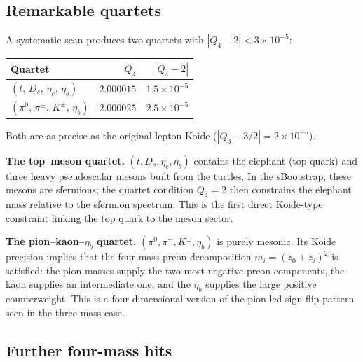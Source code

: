 \documentclass[11pt]{article}
\begin{document}
\subsection{Remarkable quartets}

A systematic scan produces two quartets with $|Q_4 - 2| < 3\times 10^{-5}$:

\begin{center}\small
\begin{tabular}{@{}l r r@{}}
\toprule
Quartet & $Q_4$ & $|Q_4-2|$ \\
\midrule
$(t,\,D_s,\,\eta_c,\,\eta_b)$ & $2.000015$ & $1.5\times 10^{-5}$ \\
$(\pi^0,\,\pi^\pm,\,K^\pm,\,\eta_b)$ & $2.000025$ & $2.5\times 10^{-5}$ \\
\bottomrule
\end{tabular}
\end{center}

\noindent Both are as precise as the original lepton Koide
($|Q_3-3/2| = 2\times 10^{-5}$).

\medskip\noindent
\textbf{The top--meson quartet.}
$(t,D_s,\eta_c,\eta_b)$ contains the elephant (top quark) and
three heavy pseudoscalar mesons built from the turtles.  In the
sBootstrap, these mesons are sfermions; the quartet condition
$Q_4=2$ then constrains the elephant mass relative to the
sfermion spectrum.  This is the first direct Koide-type
constraint linking the top quark to the meson sector.

\medskip\noindent
\textbf{The pion--kaon--$\eta_b$ quartet.}
$(\pi^0,\pi^\pm,K^\pm,\eta_b)$ is purely mesonic.  Its Koide
precision implies that the four-mass preon decomposition
$m_i = (z_0+z_i)^2$ is satisfied: the pion masses supply the
two most negative preon components, the kaon supplies an
intermediate one, and the $\eta_b$ supplies the large positive
counterweight.  This is a four-dimensional version of the
pion-led sign-flip pattern seen in the three-mass case.

\subsection{Further four-mass hits}
\end{document}
